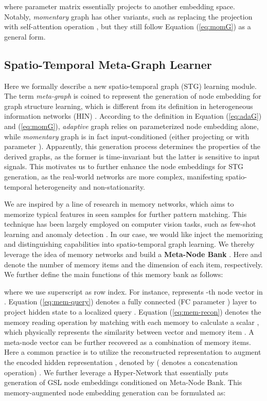 \documentclass[letterpaper]{article} \usepackage{aaai23}  \usepackage{times}  \usepackage{helvet}  \usepackage{courier}  \usepackage[hyphens]{url}  \usepackage{graphicx} \urlstyle{rm} \def\UrlFont{\rm}  \usepackage{natbib}  \usepackage{caption} \usepackage{multirow}
\begin{document}
where parameter matrix  essentially projects  to another embedding space. Notably, \textit{momentary} graph has other variants, such as replacing the projection with self-attention operation \cite{cao2020spectral}, but they still follow Equation (\ref{eq:momG}) as a general form.

\subsection{Spatio-Temporal Meta-Graph Learner}
Here we formally describe a new spatio-temporal graph (STG) learning module. The term \textit{meta-graph} is coined to represent the generation of node embedding for graph structure learning, which is different from its definition in heterogeneous information networks (HIN) \cite{zhao2017meta, ding2021diffmg}. According to the definition in Equation (\ref{eq:adaG}) and (\ref{eq:momG}), \textit{adaptive} graph relies on parameterized node embedding  alone, while \textit{momentary} graph is in fact input-conditioned (either projecting  or  with parameter ). Apparently, this generation process determines the properties of the derived graphs, as the former is time-invariant but the latter is sensitive to input signals. This motivates us to further enhance the node embeddings for STG generation, as the real-world networks are more complex, manifesting spatio-temporal heterogeneity and non-stationarity.

We are inspired by a line of research in memory networks, which aims to memorize typical features in seen samples for further pattern matching. This technique has been largely employed on computer vision tasks, such as few-shot learning \cite{vinyals2016matching, santoro2016meta} and anomaly detection \cite{gong2019memorizing, park2020learning}. In our case, we would like inject the memorizing and distinguishing capabilities into spatio-temporal graph learning. We thereby leverage the idea of memory networks and build a \textbf{Meta-Node Bank} . Here  and  denote the number of memory items and the dimension of each item, respectively. We further define the main functions of this memory bank as follows:

\vspace{-0.3cm}

where we use superscript  as row index. For instance,  represents -th node vector in . Equation (\ref{eq:mem-query}) denotes a fully connected (FC parameter ) layer to project hidden state  to a localized query . Equation (\ref{eq:mem-recon}) denotes the memory reading operation by matching  with each memory  to calculate a scalar , which physically represents the similarity between vector  and memory item . A meta-node vector  can be further recovered as a combination of memory items. Here a common practice is to utilize the reconstructed representation  to augment the encoded hidden representation , denoted by  ( denotes a concatenation operation) \cite{yao2019learning, lee2021learning}. We further leverage a Hyper-Network \cite{ha2016hypernetworks} that essentially puts generation of GSL node embeddings conditioned on Meta-Node Bank. This memory-augmented node embedding generation can be formulated as:
\end{document}
